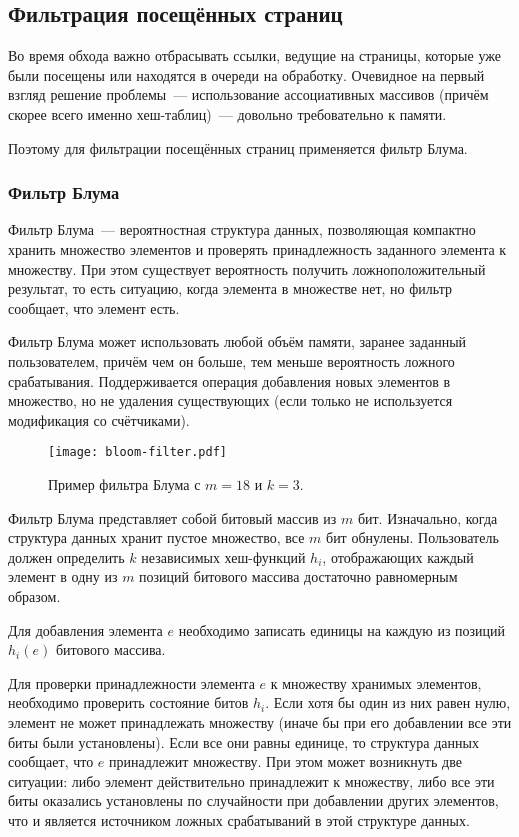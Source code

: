 \subsection{Фильтрация посещённых страниц}
Во время обхода важно отбрасывать ссылки, ведущие на страницы, которые уже были посещены или находятся в очереди на обработку. Очевидное на первый взгляд решение проблемы~--- использование ассоциативных массивов (причём скорее всего именно хеш-таблиц)~--- довольно требовательно к памяти.

Поэтому для фильтрации посещённых страниц применяется фильтр Блума.


\subsubsection{Фильтр Блума}
Фильтр Блума~--- вероятностная структура данных, позволяющая компактно хранить множество элементов и проверять принадлежность заданного элемента к множеству. При этом существует вероятность получить ложноположительный результат, то есть ситуацию, когда элемента в множестве нет, но фильтр сообщает, что элемент есть.

Фильтр Блума может использовать любой объём памяти, заранее заданный пользователем, причём чем он больше, тем меньше вероятность ложного срабатывания. Поддерживается операция добавления новых элементов в множество, но не удаления существующих (если только не используется модификация со счётчиками).

\begin{figure}[h]
  \centering
  \texttt{[image: bloom-filter.pdf]}
  \caption{Пример фильтра Блума с $m=18$ и $k=3$.}
\end{figure}

Фильтр Блума представляет собой битовый массив из $m$ бит. Изначально, когда структура данных хранит пустое множество, все $m$ бит обнулены. Пользователь должен определить $k$ независимых хеш-функций $h_i$, отображающих каждый элемент в одну из $m$ позиций битового массива достаточно равномерным образом.

Для добавления элемента $e$ необходимо записать единицы на каждую из позиций $h_i(e)$ битового массива.

Для проверки принадлежности элемента $e$ к множеству хранимых элементов, необходимо проверить состояние битов $h_i$. Если хотя бы один из них равен нулю, элемент не может принадлежать множеству (иначе бы при его добавлении все эти биты были установлены). Если все они равны единице, то структура данных сообщает, что $e$ принадлежит множеству. При этом может возникнуть две ситуации: либо элемент действительно принадлежит к множеству, либо все эти биты оказались установлены по случайности при добавлении других элементов, что и является источником ложных срабатываний в этой структуре данных.

